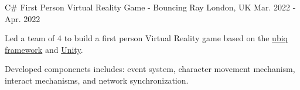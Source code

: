 \begin{cventries}

  \cventry
    {C\#} %
    {First Person Virtual Reality Game - Bouncing Ray} %
    {London, UK} %
    {Mar. 2022 - Apr. 2022} %
    {
      \begin{cvitems} %
        \item {Led a team of 4 to build a first person Virtual Reality game based on the \href{https://github.com/UCL-VR/ubiq}{ubiq framework} and \href{https://unity.com/}{Unity}.}
        \item {Developed componenets includes: event system, character movement mechanism, interact mechanisms, and network synchronization.}
      \end{cvitems}
    }


  


  

\end{cventries}

